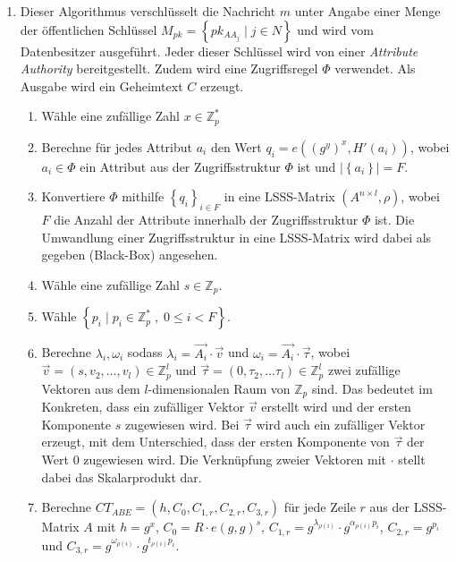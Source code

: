 \begin{enumerate}
	\item {} Dieser Algorithmus
		ver\-schlüs\-selt die Nachricht $m$ unter Angabe einer Menge der
		öffent\-lich\-en Schlüssel $M_{pk} = \left\{ pk_{AA_j} \;\vert\; j \in N
			\right\}$ und wird vom Datenbesitzer ausgeführt. Jeder dieser Schlüssel
			wird von einer \textit{Attribute Authority} bereitgestellt. Zudem wird
			eine Zugriffsregel $\Phi$ verwendet. Als Ausgabe
			wird ein Geheimtext $C$ erzeugt.
		\begin{enumerate}
			\item Wähle eine zufällige Zahl $x \in \mathbb{Z}^*_p$
			\item Berechne für jedes Attribut $a_i$ den Wert $q_i = e((g^y)^x, H'(a_i))$,
				wobei $a_i \in \Phi$ ein Attribut aus der Zugriffsstruktur $\Phi$ ist
				und $\lvert\left\{a_i\right\}\rvert = F$.
			\item Konvertiere $\Phi$ mithilfe $\left\{q_i\right\}_{i \in F}$ in eine
				LSSS-Matrix $\left( A^{n \times l}, \rho \right)$, wobei $F$ die Anzahl
				der Attribute innerhalb der Zugriffsstruktur $\Phi$ ist. Die Umwandlung
				einer Zugriffsstruktur in eine LSSS-Matrix wird dabei als gegeben
				(Black-Box) angesehen.
			\item Wähle eine zufällige Zahl $s \in \mathbb{Z}_p$.
			\item Wähle $\left\{ p_i \;\vert\; p_i \in \mathbb{Z}^*_p \;,\; 0 \leq i < F
				\right\}$.
			\item Berechne $\lambda_i, \omega_i$ sodass $\lambda_i = \vec{A_i} \cdot
				\vec{v}$ und $\omega_i = \vec{A_i} \cdot \vec{\tau}$, wobei $\vec{v} =
				\left( s, v_2, ..., v_l \right) \in \mathbb{Z}^l_p$ und $\vec{\tau} =
				\left( 0, \tau_2, ... \tau_l \right) \in \mathbb{Z}^l_p$ zwei zufällige
				Vektoren aus dem $l$-dimensionalen Raum von $\mathbb{Z}_p$ sind. Das
				bedeutet im Konkreten, dass ein zufälliger Vektor $\vec{v}$ erstellt
				wird und der ersten Komponente $s$ zugewiesen wird. Bei $\vec{\tau}$
				wird auch ein zufälliger Vektor erzeugt, mit dem Unterschied, dass der
				ersten Komponente von $\vec{\tau}$ der Wert $0$ zugewiesen wird. Die
				Verknüpfung zweier Vektoren mit $\cdot$ stellt dabei das Skalarprodukt
				dar.
			\item Berechne $CT_{ABE} = \left(h, C_0, C_{1,r}, C_{2,r}, C_{3,r}\right)$
				für jede Zeile $r$ aus der LSSS-Matrix $A$ mit
				$h = g^x$,
				$C_0 = R \cdot e(g, g)^s$,
				$C_{1,r} = g^{\lambda_{\rho(i)}} \cdot g^{\alpha_{\rho(i)}p_i}$,
				$C_{2,r} = g^{p_i}$ und 
				$C_{3,r} = g^{\omega_{\rho(i)}} \cdot g^{t_{\rho(i)}p_i}$.

\end{enumerate}
\end{enumerate}
